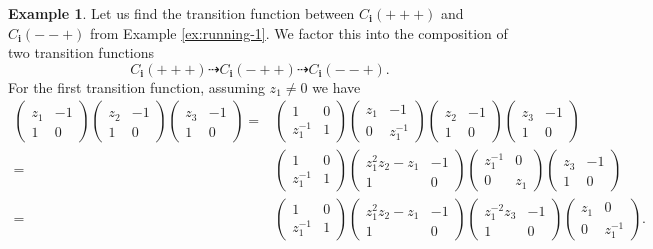 \documentclass[a4paper, 11pt]{amsart}
\newcommand{\word}[1]{\mathbf{#1}}
\theoremstyle{definition}
\newtheorem{example}[theorem]{Example}
\begin{document}
\begin{example}\label{ex:running-transitions}
Let us find the transition function between $C_{\word{i}}(+++)$ and $C_{\word{i}}(--+)$ from Example \ref{ex:running-1}. We factor this into the composition of two transition functions
\[
C_{\word{i}}(+++) \dashrightarrow C_{\word{i}}(-++) \dashrightarrow C_{\word{i}}(--+).
\]
For the first transition function, assuming $z_1 \neq 0$ we have
\[
\begin{array}{rl}
\begin{pmatrix} z_1 & - 1 \\ 1 & 0 \end{pmatrix}\begin{pmatrix} z_2 & - 1 \\ 1 & 0 \end{pmatrix}\begin{pmatrix} z_3 & - 1 \\ 1 & 0 \end{pmatrix} = & 
\begin{pmatrix} 1 & 0 \\ z_1^{-1} & 1 \end{pmatrix} \begin{pmatrix} z_1 & - 1 \\ 0 & z_1^{-1} \end{pmatrix} \begin{pmatrix} z_2 & - 1 \\ 1 & 0 \end{pmatrix}\begin{pmatrix} z_3 & - 1 \\ 1 & 0 \end{pmatrix} \\
= & \begin{pmatrix} 1 & 0 \\ z_1^{-1} & 1 \end{pmatrix}  \begin{pmatrix} z_1^{2}z_2 - z_1 & - 1 \\ 1 & 0 \end{pmatrix} \begin{pmatrix} z_1^{-1} & 0 \\ 0 & z_1 \end{pmatrix} \begin{pmatrix} z_3 & - 1 \\ 1 & 0 \end{pmatrix} \\
= & \begin{pmatrix} 1 & 0 \\ z_1^{-1} & 1 \end{pmatrix}  \begin{pmatrix} z_1^{2}z_2 - z_1 & - 1 \\ 1 & 0 \end{pmatrix} \begin{pmatrix} z_1^{-2}z_3 & -1 \\ 1 & 0 \end{pmatrix} \begin{pmatrix} z_1 & 0 \\ 0 & z_1^{-1} \end{pmatrix}.

\end{array}\]
\end{example}
\end{document}
